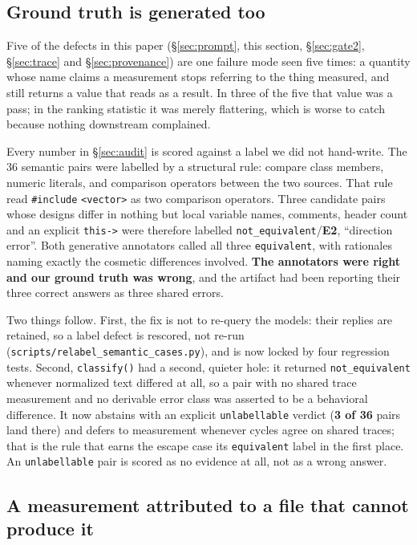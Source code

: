 \documentclass[10pt,twocolumn]{article}
\begin{document}
\subsection{Ground truth is generated too}
\label{sec:groundtruth}

Five of the defects in this paper (\S\ref{sec:prompt}, this section,
\S\ref{sec:gate2}, \S\ref{sec:trace} and \S\ref{sec:provenance}) are one failure mode
seen five times: a quantity whose name claims a measurement stops referring to the thing
measured, and still returns a value that reads as a result. In three of the five that
value was a pass; in the ranking statistic it was merely flattering, which is worse to
catch because nothing downstream complained.

Every number in \S\ref{sec:audit} is scored against a label we did not hand-write.
The 36 semantic pairs were labelled by a structural rule: compare class members,
numeric literals, and comparison operators between the two sources. That rule read
\texttt{\#include} \texttt{<vector>} as two comparison operators. Three candidate
pairs whose designs differ in nothing but local variable names, comments, header
count and an explicit \texttt{this->} were therefore labelled
\texttt{not\_equivalent}/\textbf{E2}, ``direction error''. Both generative
annotators called all three \texttt{equivalent}, with rationales naming exactly
the cosmetic differences involved. \textbf{The annotators were right and our ground
truth was wrong}, and the artifact had been reporting their three correct answers
as three shared errors.

Two things follow. First, the fix is not to re-query the models: their replies are
retained, so a label defect is rescored, not re-run
(\texttt{scripts/relabel\_semantic\_cases.py}), and is now locked by four regression
tests. Second, \texttt{classify()} had a second, quieter hole: it returned
\texttt{not\_equivalent} whenever normalized text differed at all, so a pair with no
shared trace measurement and no derivable error class was asserted to be a
behavioral difference. It now abstains with an explicit \texttt{unlabellable}
verdict (\textbf{3 of 36} pairs land there) and defers to measurement whenever
cycles agree on shared traces; that is the rule that earns the escape case its
\texttt{equivalent} label in the first place. An \texttt{unlabellable} pair is
scored as no evidence at all, not as a wrong answer.

\subsection{A measurement attributed to a file that cannot produce it}
\label{sec:attribution}
\end{document}
